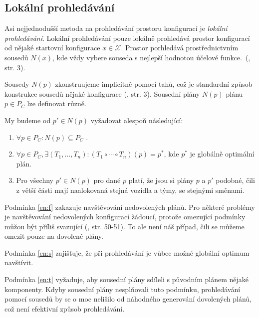 \subsection{Lokální prohledávání}\label{kap:localSearch}

Asi nejjednodušší metoda na prohledávání prostoru konfigurací je \textit{lokální prohledávání}.
Lokální prohledávání pouze lokálně prohledává prostor konfigurací od nějaké startovní konfigurace $x \in \mathcal{X}$. 
Prostor porhledává prostřednictvním sousedů $N(x)$, kde vždy vybere souseda s nejlepší hodnotou účelové funkce.~(\citet{HybridMeta}, str. 3).

Sousedy $N(p)$ zkonstruujeme implicitně pomocí tahů, což je standardní způsob konstrukce sousedů nějaké konfigurace (\citet{HybridMeta}, str. 3).
Sousední plány $N(p)$ plánu $p \in P_C$ lze definovat různě. 

My budeme od $p' \in N(p)$ vyžadovat alespoň následující:
\begin{enumerate}\label{enum:sousediNutnost}
  \item $\forall p \in P_C \colon N(p) \subseteq P_C$ \label{en:f}.
  \item $\forall p \in P_C, \exists(T_1, \dots, T_n) \colon (T_1 \circ \cdots \circ T_n)(p) = p^*$, kde $p^*$ je globálně optimální plán. \label{en:s}
  \item Pro všechny $p' \in N(p)$ pro dané $p$ platí, že jsou si plány $p$ a $p'$ podobné, čili z větší části mají naalokovaná stejná vozidla a týmy, se stejnými směnami. \label{en:t}
\end{enumerate}

Podmínka \ref{en:f} zakazuje navštěvování nedovolených plánů. Pro některé problémy je navštěvování nedovolených konfigurací žádoucí,
protože omezující podmínky můžou být příliš svazující (\citet{GlovKoch03}, str. 50-51).
To ale není náš případ, čili se můžeme omezit pouze na dovolené plány.

Podmínka  \ref{en:s} zajišťuje, že při prohledávání je vůbec možné globální optimum navštívit.

Podmínka \ref{en:t} vyžaduje, aby sousední plány sdíleli s původním plánem nějaké komponenty. 
Kdyby sousední plány nesplňovali tuto podmínku, prohledávání pomocí sousedů by se o moc nelišilo od náhodného
generování dovolených plánů, což není efektivní způsob prohledávání.

